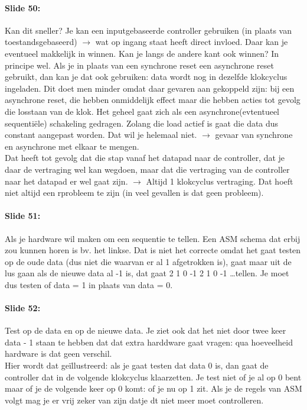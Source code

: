 \documentclass[10pt,a4paper]{book}
\begin{document}
\paragraph{Slide 50:} Kan dit sneller? Je kan een inputgebaseerde controller gebruiken (in plaats van toestandsgebaseerd) $\rightarrow$ wat op ingang staat heeft direct invloed. Daar kan je eventueel makkelijk in winnen. Kan je langs de andere kant ook winnen? In principe wel. Als je in plaats van een synchrone reset een asynchrone reset gebruikt, dan kan je dat ook gebruiken: data wordt nog in dezelfde klokcyclus ingeladen. Dit doet men minder omdat daar gevaren aan gekoppeld zijn: bij een asynchrone reset, die hebben onmiddelijk effect maar die hebben acties tot gevolg die losstaan van de klok. Het geheel gaat zich als een asynchrone(evtentueel sequenti\"ele) schakeling gedragen.
Zolang die load actief is gaat die data dus constant aangepast worden. Dat wil je helemaal niet. $\rightarrow$ gevaar van synchrone en asynchrone met elkaar te mengen.\\
Dat heeft tot gevolg dat die stap vanaf het datapad naar de controller, dat je daar de vertraging wel kan wegdoen, maar dat die vertraging van de controller naar het datapad er wel gaat zijn. $\rightarrow$ Altijd 1 klokcyclus vertraging. Dat hoeft niet altijd een rprobleem te zijn (in veel gevallen is dat geen probleem).

\paragraph{Slide 51:} Als je hardware wil maken om een sequentie te tellen. Een ASM schema dat erbij zou kunnen horen is bv. het linkse. Dat is niet het correcte omdat het gaat testen op de oude data (dus niet die waarvan er al 1 afgetrokken is), gaat maar uit de lus gaan als de nieuwe data al -1 is, dat gaat 2 1 0 -1 2 1 0 -1 \ldots tellen. Je moet dus testen of data = 1 in plaats van data = 0.

\paragraph{Slide 52:} Test op de data en op de nieuwe data. Je ziet ook dat het niet door twee keer data - 1 staan te hebben dat dat extra harddware gaat vragen: qua hoeveelheid hardware is dat geen verschil.\\
Hier wordt dat ge\"illustreerd: als je gaat testen dat data 0 is, dan gaat de controller dat in de volgende klokcyclus klaarzetten. Je test niet of je al op 0 bent maar of je de volgende keer op 0 komt: of je nu op 1 zit. Als je de regels van ASM volgt mag je er vrij zeker van zijn datje dt niet meer moet controlleren. 
\end{document}
